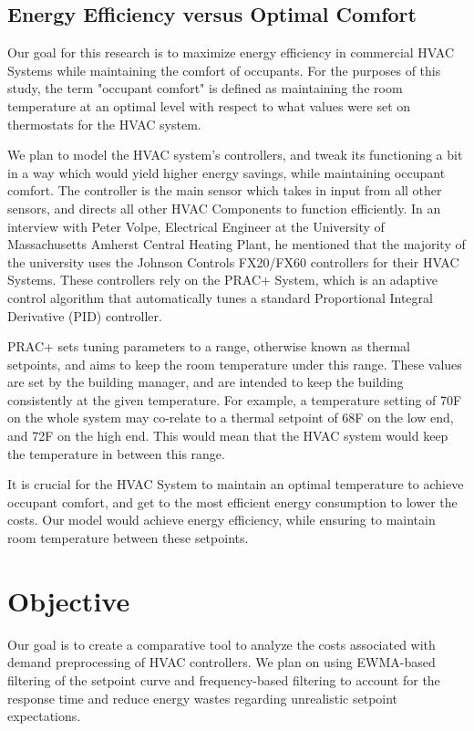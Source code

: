 \documentclass[conference,letterpaper]{IEEEtran}
\begin{document}
\subsection{Energy Efficiency versus Optimal Comfort}

Our goal for this research is to maximize energy efficiency in commercial HVAC Systems while maintaining the comfort of occupants. For the purposes of this study, the term "occupant comfort" is defined as maintaining the room temperature at an optimal level with respect to what values were set on thermostats for the HVAC system.

We plan to model the HVAC system's controllers, and tweak its functioning a bit in a way which would yield higher energy savings, while maintaining occupant comfort. The controller is the main sensor which takes in input from all other sensors, and directs all other HVAC Components to function efficiently. In an interview with Peter Volpe, Electrical Engineer at the University of Massachusetts Amherst Central Heating Plant, he mentioned that the majority of the university uses the Johnson Controls FX20/FX60 controllers for their HVAC Systems. These controllers rely on the PRAC+ System\cite{johnsoncontrolsOpenBlueBuilding}, which is an adaptive control algorithm that automatically tunes a standard Proportional Integral Derivative (PID) controller.

PRAC+ sets tuning parameters to a range, otherwise known as thermal setpoints, and aims to keep the room temperature under this range. These values are set by the building manager, and are intended to keep the building consistently at the given temperature. For example, a temperature setting of 70\textdegree F on the whole system may co-relate to a thermal setpoint of 68\textdegree F on the low end, and 72\textdegree F on the high end. This would mean that the HVAC system would keep the temperature in between this range. 

It is crucial for the HVAC System to maintain an optimal temperature to achieve occupant comfort, and get to the most efficient energy consumption to lower the costs. Our model would achieve energy efficiency, while ensuring to maintain room temperature between these setpoints.

\section{Objective}
\label{sec:Objective}
Our goal is to create a comparative tool to analyze the costs associated with demand preprocessing of HVAC controllers. We plan on using EWMA-based filtering of the setpoint curve and frequency-based filtering to account for the response time and reduce energy wastes regarding unrealistic setpoint expectations. 
\end{document}
